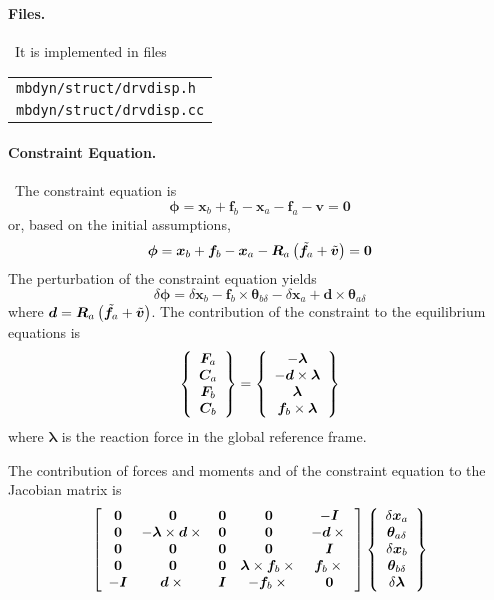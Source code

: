 \documentclass[10pt,dvips,fleqn,subeqn]{report}
\newcommand{\T}[1]{\bm{#1}}
\begin{document}
\paragraph{Files.} \
It is implemented in files

\begin{tabular}{l}
\texttt{mbdyn/struct/drvdisp.h} \\
\texttt{mbdyn/struct/drvdisp.cc}
\end{tabular}

\paragraph{Constraint Equation.} \
The constraint equation is
\begin{equation}
	\T{\phi} = \T{x}_b + \T{f}_b - \T{x}_a - \T{f}_a - \T{v} = \T{0}
\end{equation}
or, based on the initial assumptions,
\begin{equation}
	\T{\phi} = \T{x}_b + \T{f}_b - \T{x}_a
		- \T{R}_a\plbr{\tilde{\T{f}}_a + \tilde{\T{v}}} = \T{0}
\end{equation}
The perturbation of the constraint equation yields
\begin{equation}
	\delta\T{\phi} = 
		\delta\T{x}_b
		- \T{f}_b\times\T{\theta}_{b\delta}
		- \delta\T{x}_a
		+ \T{d}\times\T{\theta}_{a\delta}
\end{equation}
where $\T{d}=\T{R}_a\plbr{\tilde{\T{f}}_a + \tilde{\T{v}}}$.
The contribution of the constraint to the equilibrium equations is
\begin{equation}
	\cubr{\cvvect{
		\T{F}_a \\
		\T{C}_a \\
		\T{F}_b \\
		\T{C}_b
	}} = \cubr{\cvvect{
		- \T{\lambda} \\
		- \T{d}\times\T{\lambda} \\
		\T{\lambda} \\
		\T{f}_b\times\T{\lambda}
	}}
\end{equation}
where $\T{\lambda}$ is the reaction force in the global reference frame.

The contribution of forces and moments and of the constraint equation 
to the Jacobian matrix is
\begin{equation}
	\sqbr{\matr{ccccc}{
		\T{0} & \T{0} & \T{0} & \T{0} & - \T{I} \\
		\T{0} & - \T{\lambda}\times\T{d}\times{} & \T{0} & \T{0} & - \T{d}\times{}\\
		\T{0} & \T{0} & \T{0} & \T{0} & \T{I} \\
		\T{0} & \T{0} & \T{0} & \T{\lambda}\times\T{f}_b\times{} & \T{f}_b\times{} \\
		- \T{I} & \T{d}\times{} & \T{I} & - \T{f}_b\times{} & \T{0}
	}}\cubr{\cvvect{
		\delta\T{x}_a \\
		\T{\theta}_{a\delta} \\
		\delta\T{x}_b \\
		\T{\theta}_{b\delta} \\
		\delta\T{\lambda}
	}}
\end{equation}
\end{document}
